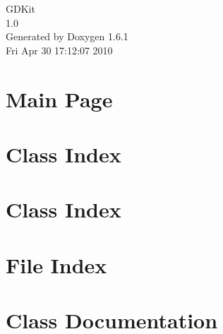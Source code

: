 \documentclass[a4paper]{book}
\begin{document}
\hypersetup{pageanchor=false}
\begin{titlepage}
\vspace*{7cm}
\begin{center}
{\Large GDKit \\[1ex]\large 1.0 }\\
\vspace*{1cm}
{\large Generated by Doxygen 1.6.1}\\
\vspace*{0.5cm}
{\small Fri Apr 30 17:12:07 2010}\\
\end{center}
\end{titlepage}
\clearemptydoublepage
{}
\tableofcontents
\clearemptydoublepage
{}
\hypersetup{pageanchor=true}
\chapter{Main Page}
\label{index}\hypertarget{index}{}
\chapter{Class Index}

\chapter{Class Index}

\chapter{File Index}

\chapter{Class Documentation}



































\end{document}
